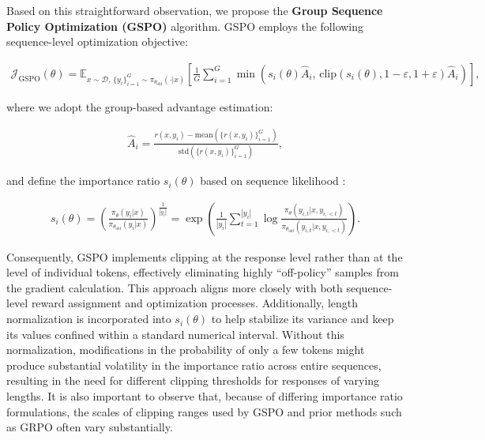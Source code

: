 Based on this straightforward observation, we propose the \textbf{Group Sequence Policy Optimization (GSPO)} algorithm. GSPO employs the following sequence-level optimization objective:

\begin{align}
\mathcal{J}_\text{GSPO} (\theta) =
\mathbb{E}_{ x \sim \mathcal{D},\, \{y_i\}_{i=1}^G \sim \pi_{\theta_\text{old}}( \cdot | x) }
\left[ 
\frac{1}{G} \sum_{i=1}^{G}
\min \left( s_{i}(\theta)  \widehat{A}_{i},  \, \mathrm{clip} \left( s_{i}(\theta), 1 - {\varepsilon}, 1 + {\varepsilon} \right) \widehat{A}_{i} \right) 
\right],
\label{equ:gspo}
\end{align}

where we adopt the group-based advantage estimation:

\begin{align}
\widehat{A}_{i} = \frac{r(x, y_i) - \mathrm{mean} \left( \{ r(x, y_i) \}_{i=1}^G \right) }{ \mathrm{std} \left( \{ r(x, y_i) \}_{i=1}^G \right) },
\end{align}

and define the importance ratio $s_{i}(\theta)$ based on sequence likelihood \citep{click}:

\begin{align}
s_{i}(\theta) = \left( \frac{ \pi_{\theta} (y_i | x) }{ \pi_{\theta_\text{old}} (y_i | x)} \right)^{\frac{1}{|y_i|}}
=
\exp \left( \frac{1}{|y_i|} \sum_{t=1}^{|y_i|} \log \frac{ \pi_{\theta} (y_{i,t} | x, y_{i,<t}) }{ \pi_{\theta_\text{old}} (y_{i,t} | x,y_{i,<t})} \right).
\end{align}

Consequently, GSPO implements clipping at the response level rather than at the level of individual tokens, effectively eliminating highly “off-policy” samples from the gradient calculation. This approach aligns more closely with both sequence-level reward assignment and optimization processes. Additionally, length normalization is incorporated into $s_{i}(\theta)$ to help stabilize its variance and keep its values confined within a standard numerical interval. Without this normalization, modifications in the probability of only a few tokens might produce substantial volatility in the importance ratio across entire sequences, resulting in the need for different clipping thresholds for responses of varying lengths. It is also important to observe that, because of differing importance ratio formulations, the scales of clipping ranges used by GSPO and prior methods such as GRPO often vary substantially.


